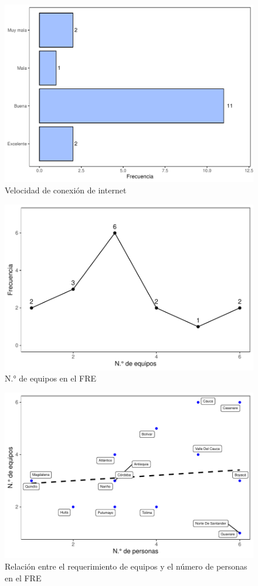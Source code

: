 \documentclass[
]{book}
\begin{document}
\begin{figure}
\includegraphics[width=0.85\linewidth]{InformeFinal_files/figure-latex/ConexionInternet-1} \caption{Velocidad de conexión de internet}\label{fig:ConexionInternet}
\end{figure}

\begin{figure}
\includegraphics[width=0.85\linewidth]{InformeFinal_files/figure-latex/EquiposComputo-1} \caption{N.° de equipos en el FRE}\label{fig:EquiposComputo}
\end{figure}

\begin{figure}
\includegraphics[width=0.85\linewidth]{InformeFinal_files/figure-latex/RelacionEquiposPersonal-1} \caption{Relación entre el requerimiento de equipos y el número de personas en el FRE}\label{fig:RelacionEquiposPersonal}
\end{figure}
\end{document}
